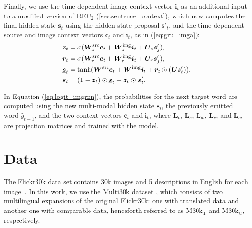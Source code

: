 \documentclass[11pt]{article}
\begin{document}
Finally, we use the time-dependent image context vector $\bm{i}_t$ as an additional input to a modified version of REC$_2$ (\cref{sec:sentence_context}), which now computes the final hidden state $\bm{s}_t$ using the hidden state proposal $\bm{s}'_t$, and the time-dependent source and image context vectors $\bm{c}_t$ and $\bm{i}_t$, as in (\ref{eq:gru_imga}):
\begin{align}
\label{eq:gru_imga}
\bm{z}_t &= \sigma (\bm{W}^\text{src}_z \bm{c}_t + \bm{W}^\text{img}_z \bm{i}_t + \bm{U}_z \bm{s}'_j),\notag\\
\bm{r}_t &= \sigma (\bm{W}^\text{src}_r \bm{c}_t + \bm{W}^\text{img}_r \bm{i}_t + \bm{U}_r \bm{s}'_j),\notag\\
\underline{\bm{s}}_t &= \tanh( \bm{W}^\text{src} \bm{c}_t + \bm{W}^\text{img} \bm{i}_t + \bm{r}_t \odot (\bm{U}\bm{s}'_t)),\notag\\
\bm{s}_t &= (1 - \bm{z}_t)\odot \underline{\bm{s}}_t + \bm{z}_t \odot \bm{s}'_t.
\end{align}
\begin{comment}
\begin{align}
\label{eq:gru_imga}
\bm{s}_t &= (1 - \bm{z}_t)\odot \underline{\bm{s}}_t + \bm{z}_t \odot \bm{s}'_t,\notag\\
\underline{\bm{s}}_t &= \tanh( \bm{W}^\text{src} \bm{c}_t + \bm{W}^\text{img} \bm{i}_t + \bm{r}_t \odot (\bm{U}\bm{s}'_t)),\notag\\
\bm{r}_t &= \sigma (\bm{W}^\text{src}_r \bm{c}_t + \bm{W}^\text{img}_r \bm{i}_t + \bm{U}_r \bm{s}'_j),\notag\\
\bm{z}_t &= \sigma (\bm{W}^\text{src}_z \bm{c}_t + \bm{W}^\text{img}_z \bm{i}_t + \bm{U}_z \bm{s}'_j).
\end{align}
\end{comment}

In Equation (\ref{eq:logit_imgrnn}), the probabilities for the next target word are computed using the new multi-modal hidden state $\bm{s}_t$, the previously emitted word $\hat{y}_{t-1}$, and the two context vectors $\bm{c}_t$ and $\bm{i}_t$, where $\bm{L}_o$, $\bm{L}_s$, $\bm{L}_w$, $\bm{L}_{cs}$ and $\bm{L}_{ci}$ are projection matrices and trained with the model.



\section{Data}
\label{sec:dataset}

The Flickr30k data set contains 30k images and 5 descriptions in English for each image~\cite{Youngetal2014}.
In this work, we use the Multi30k dataset \cite{ElliottFrankSimaanSpecia2016}, which consists of two multilingual expansions of the original Flickr30k: one with translated data and another one with comparable data, henceforth referred to as M30k$_\text{T}$ and M30k$_\text{C}$, respectively.
\end{document}
